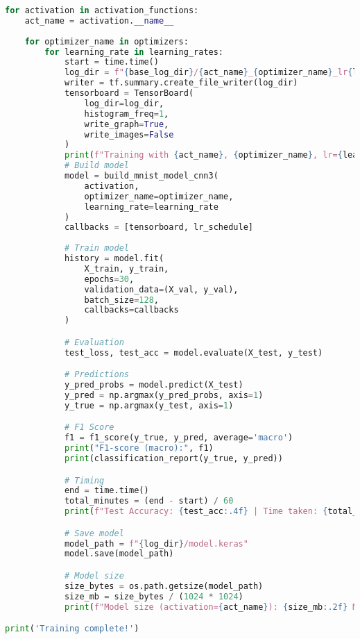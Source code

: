 \begin{lstlisting}[language=Python, ]
for activation in activation_functions:
    act_name = activation.__name__
    
    for optimizer_name in optimizers:
        for learning_rate in learning_rates:
            start = time.time()
            log_dir = f"{base_log_dir}/{act_name}_{optimizer_name}_lr{learning_rate}"
            writer = tf.summary.create_file_writer(log_dir)
            tensorboard = TensorBoard(
                log_dir=log_dir,
                histogram_freq=1,
                write_graph=True,
                write_images=False
            )
            print(f"Training with {act_name}, {optimizer_name}, lr={learning_rate}")
            # Build model
            model = build_mnist_model_cnn3(
                activation,
                optimizer_name=optimizer_name,
                learning_rate=learning_rate
            )
            callbacks = [tensorboard, lr_schedule]
            
            # Train model
            history = model.fit(
                X_train, y_train,
                epochs=30,
                validation_data=(X_val, y_val),
                batch_size=128,
                callbacks=callbacks
            )

            # Evaluation
            test_loss, test_acc = model.evaluate(X_test, y_test)

            # Predictions
            y_pred_probs = model.predict(X_test)
            y_pred = np.argmax(y_pred_probs, axis=1)
            y_true = np.argmax(y_test, axis=1)

            # F1 Score
            f1 = f1_score(y_true, y_pred, average='macro')
            print("F1-score (macro):", f1)
            print(classification_report(y_true, y_pred))

            # Timing
            end = time.time()
            total_minutes = (end - start) / 60
            print(f"Test Accuracy: {test_acc:.4f} | Time taken: {total_minutes:.2f} min for {act_name}, optimizer={optimizer_name}, learning_rate={learning_rate}")

            # Save model
            model_path = f"{log_dir}/model.keras"
            model.save(model_path)

            # Model size
            size_bytes = os.path.getsize(model_path)
            size_mb = size_bytes / (1024 * 1024)
            print(f"Model size (activation={act_name}): {size_mb:.2f} MB")

print('Training complete!')

    
\end{lstlisting}

